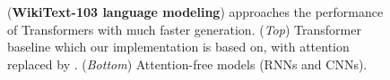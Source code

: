 \begin{figure}
\begin{minipage}[t]{0.47\linewidth}
  \caption{
    (\textbf{WikiText-103 language modeling})
    \methodabbrv{} approaches the performance of Transformers with much faster generation.
    (\textit{Top}) Transformer baseline which our implementation is based on, with attention replaced by \methodabbrv.
    (\textit{Bottom}) Attention-free models (RNNs and CNNs).
  }
  \label{tab:wt103}
\end{minipage}
\end{figure}


